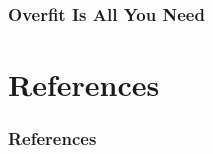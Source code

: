 \documentclass{beamer}
\begin{document}
\begin{frame}
    \frametitle{Overfit Is All You Need}



\end{frame}

\section*{References}

\begin{frame}[allowframebreaks]
    \frametitle{References}

    
    
\end{frame}
\end{document}

